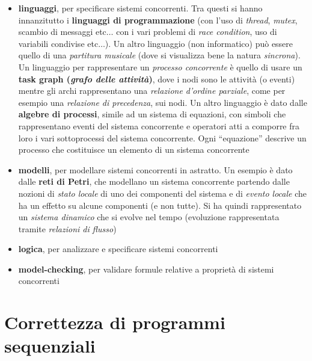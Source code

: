 \documentclass[a4paper,12pt, oneside]{book}
\begin{document}
\begin{itemize}
  \item \textbf{linguaggi}, per specificare sistemi concorrenti. Tra questi si
  hanno innanzitutto i \textbf{linguaggi di programmazione} (con l'uso di
  \textit{thread}, \textit{mutex}, scambio di messaggi etc$\ldots$ con i vari
  problemi di \textit{race condition}, uso di variabili condivise
  etc$\ldots$). Un altro linguaggio (non informatico) può essere quello di una
  \textit{partitura musicale} (dove si visualizza bene la natura
  \textit{sincrona}). Un linguaggio per rappresentare un \textit{processo
    concorrente} è quello di usare un \textbf{task graph (\textit{grafo delle
      attività})}, dove i nodi sono le attività (o eventi) mentre gli archi
  rappresentano una \textit{relazione d'ordine parziale}, come per esempio una
  \textit{relazione di precedenza}, sui nodi. Un altro linguaggio è dato dalle
  \textbf{algebre di processi}, simile ad un sistema di equazioni, con simboli
  che rappresentano eventi del sistema concorrente e operatori atti a comporre
  fra loro i vari sottoprocessi del sistema concorrente. Ogni ``equazione''
  descrive un processo che costituisce un elemento di un sistema concorrente
  \item \textbf{modelli}, per modellare sistemi concorrenti in astratto. Un
  esempio è dato dalle \textbf{reti di Petri}, che modellano un sistema
  concorrente partendo dalle nozioni di \textit{stato locale} di uno dei
  componenti del sistema e di \textit{evento locale} che ha un effetto su alcune
  componenti (e non tutte). Si ha quindi rappresentato un \textit{sistema
    dinamico} che si evolve nel tempo (evoluzione rappresentata tramite
 \textit{relazioni di flusso})
  \item \textbf{logica}, per analizzare e specificare sistemi concorrenti
  \item \textbf{model-checking}, per validare formule relative a proprietà di
  sistemi concorrenti 
\end{itemize}
\chapter{Correttezza di programmi sequenziali}
\end{document}
